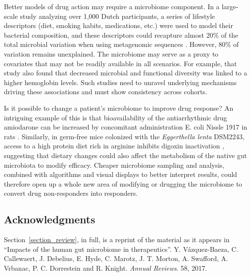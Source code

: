 Better models of drug action may require a microbiome component. In a large-scale study analyzing over 1,000 Dutch participants, a series of lifestyle descriptors (diet, smoking habits, medications, etc.) were used to model their bacterial composition, and these descriptors could recapture almost 20\% of the total microbial variation when using metagenomic sequences \cite{RN4059}. However, 80\% of variation remains unexplained. The microbiome may serve as a proxy to covariates that may not be readily available in all scenarios. For example, that study also found that decreased microbial and functional diversity was linked to a higher hemoglobin levels. Such studies need to unravel underlying mechanisms driving these associations and must show consistency across cohorts. 

Is it possible to change a patient's microbiome to improve drug response?  An 
intriguing example of this is that bioavailability of the antiarrhythmic drug 
amiodarone can be increased by concomitant administration E. coli Nissle 1917 
in rats \cite{RN4086, RN4201}. Similarly, in germ-free mice colonized with the 
\textit{Eggerthella lenta} DSM2243, access to a high protein diet rich in 
arginine inhibits digoxin inactivation \cite{RN4102, RN4202}, suggesting that 
dietary changes could also affect the metabolism of the native gut microbiota 
to modify efficacy. Cheaper microbiome sampling and analysis, combined with 
algorithms and visual displays to better interpret results, could therefore 
open up a whole new area of modifying or drugging the microbiome to convert 
drug non-responders into responders.

\subsection{Acknowledgments}

Section~\ref{section_review}, in full, is a reprint of the material as it 
appears in ``Impacts of the human gut microbiome in therapeutics''. Y.  
V\'azquez-Baeza, C. Callewaert, J. Debelius, E. Hyde, C.  Marotz, J. T.  
Morton, A. Swafford, A. Vrbanac, P. C.  Dorrestein and R.  Knight.  
\emph{Annual Reviews}. 58, 2017.
